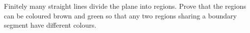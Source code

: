 Finitely many straight lines divide the plane into regions. Prove that the regions can be coloured brown and green so that any two regions sharing a boundary segment have different colours.
